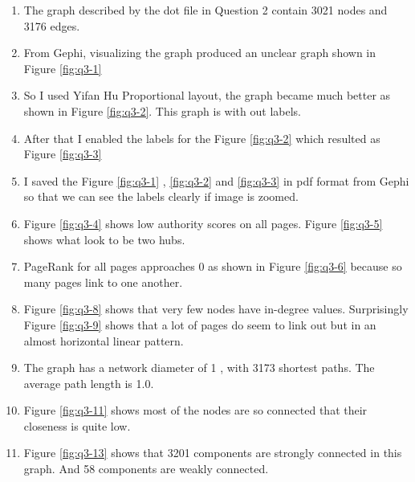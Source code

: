 \begin{enumerate}
\item The graph described by the dot file in Question 2 contain 3021 nodes and 3176 edges. 
\item From Gephi, visualizing the graph produced an unclear graph shown in Figure \ref{fig:q3-1}
\item So I used Yifan Hu Proportional layout, the graph became much better as shown in Figure \ref{fig:q3-2}. This graph is with out labels. 
\item After that I enabled the labels for the Figure \ref{fig:q3-2} which resulted as Figure \ref{fig:q3-3}
\item I saved the Figure \ref{fig:q3-1} , \ref{fig:q3-2} and \ref{fig:q3-3} in pdf format from Gephi so that we can see the labels clearly if image is zoomed.
\item Figure \ref{fig:q3-4} shows low authority scores on all pages. Figure \ref{fig:q3-5} shows what look to be two hubs. 
\item PageRank for all pages approaches 0 as shown in Figure \ref{fig:q3-6} because so many pages link to one another. 
\item Figure \ref{fig:q3-8} shows that very few nodes have in-degree values. 
Surprisingly Figure \ref{fig:q3-9} shows that a lot of pages do seem to link out but in an almost horizontal linear pattern. 
\item The graph has a network diameter of 1 , with 3173 shortest paths. The average path length is 1.0. 
\item Figure \ref{fig:q3-11} shows most of the nodes are so connected that their closeness is quite low.
\item Figure \ref{fig:q3-13} shows that 3201 components are strongly connected in this graph. And 58 components are weakly connected.
\end{enumerate}

